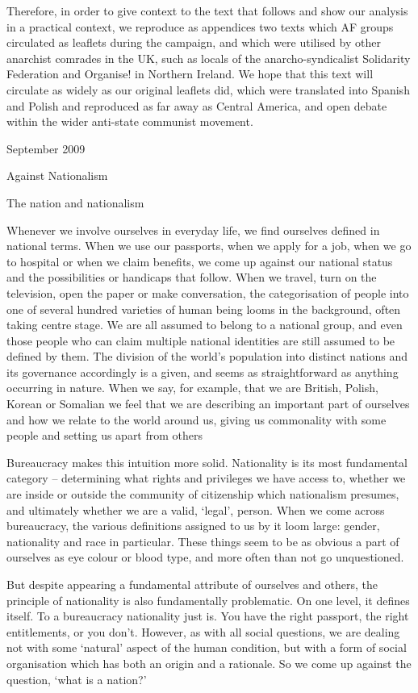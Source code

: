 Therefore, in order to give context to the text that follows and show our analysis in a practical context, we reproduce as appendices two texts which AF groups circulated as leaflets during the campaign, and which were utilised by other anarchist comrades in the UK, such as locals of the anarcho-syndicalist Solidarity Federation and Organise! in Northern Ireland.
We hope that this text will circulate as widely as our original leaflets did, which were translated into Spanish and Polish and reproduced as far away as Central America, and open debate within the wider anti-state communist movement.

September 2009

Against Nationalism

The nation and nationalism

Whenever we involve ourselves in everyday life, we find ourselves defined in national terms.
When we use our passports, when we apply for a job, when we go to hospital or when we claim benefits, we come up against our national status and the possibilities or handicaps that follow.
When we travel, turn on the television, open the paper or make conversation, the categorisation of people into one of several hundred varieties of human being looms in the background, often taking centre stage.
We are all assumed to belong to a national group, and even those people who can claim multiple national identities are still assumed to be defined by them.
The division of the world’s population into distinct nations and its governance accordingly is a given, and seems as straightforward as anything occurring in nature.
When we say, for example, that we are British, Polish, Korean or Somalian we feel that we are describing an important part of ourselves and how we relate to the world around us, giving us commonality with some people and setting us apart from others

Bureaucracy makes this intuition more solid.
Nationality is its most fundamental category – determining what rights and privileges we have access to, whether we are inside or outside the community of citizenship which nationalism presumes, and ultimately whether we are a valid, ‘legal’, person.
When we come across bureaucracy, the various definitions assigned to us by it loom large: gender, nationality and race in particular.
These things seem to be as obvious a part of ourselves as eye colour or blood type, and more often than not go unquestioned.

But despite appearing a fundamental attribute of ourselves and others, the principle of nationality is also fundamentally problematic.
On one level, it defines itself.
To a bureaucracy nationality just is.
You have the right passport, the right entitlements, or you don’t.
However, as with all social questions, we are dealing not with some ‘natural’ aspect of the human condition, but with a form of social organisation which has both an origin and a rationale.
So we come up against the question, ‘what is a nation?’

